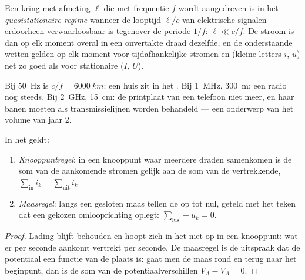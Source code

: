 \begin{definition}\label{def:b1:dc-circuits:arqs}
Een kring met afmeting $\ell$ die met frequentie $f$ wordt aangedreven is in
het \emph{quasistationaire regime} wanneer de looptijd $\ell/c$ van
elektrische signalen erdoorheen verwaarloosbaar is tegenover de periode $1/f$:
$\ell \ll c/f$. De stroom is dan op elk moment overal in een
onvertakte draad dezelfde, en de onderstaande wetten gelden op elk
moment voor tijdafhankelijke stromen en  (kleine letters $i$, $u$)
net zo goed als voor stationaire ($I$, $U$).
\end{definition}

\begin{example}\label{ex:b1:dc-circuits:arqs}
Bij \qty{50}{Hz} is $c/f = \qty{6000}{km}$: een huis zit in het
. Bij \qty{1}{MHz}, \qty{300}{m}: een radio nog steeds. Bij \qty{2}{GHz},
\qty{15}{cm}: de printplaat van een telefoon niet meer, en haar banen moeten
als transmissielijnen worden behandeld --- een onderwerp van het volume van jaar 2.
\end{example}

\begin{theorem}\label{thm:b1:dc-circuits:kirchhoff}
In het  geldt:
\begin{enumerate}
  \item \emph{Knooppuntregel}: in een knooppunt waar meerdere draden
        samenkomen is de som van de aankomende stromen gelijk aan de som
        van de vertrekkende, $\sum_{\text{in}} i_k = \sum_{\text{uit}} i_k$.
  \item \emph{Maasregel}: langs een gesloten maas tellen de  op
        tot nul, geteld met het teken dat een gekozen omlooprichting
        oplegt: $\sum_{\text{lus}} \pm u_k = 0$.
\end{enumerate}
\end{theorem}

\begin{proof}
Lading blijft behouden en hoopt zich in het  niet op
in een knooppunt: wat er per seconde aankomt vertrekt per seconde. De
maasregel is de uitspraak dat de potentiaal een functie van de plaats is: gaat
men de maas rond en terug naar het beginpunt, dan is de som van de
potentiaalverschillen $V_A - V_A = 0$.
\end{proof}

